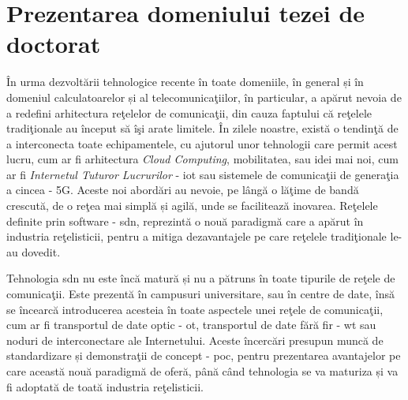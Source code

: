 \section{Prezentarea domeniului tezei de doctorat}

În urma dezvoltării tehnologice recente în toate domeniile, în general și în domeniul calculatoarelor și al telecomunicaţiilor, în particular, a apărut nevoia de a redefini arhitectura reţelelor de comunicaţii, din cauza faptului că reţelele tradiţionale au început să îşi arate limitele. În zilele noastre, există o tendinţă de a interconecta toate echipamentele, cu ajutorul unor tehnologii care permit acest lucru, cum ar fi arhitectura \textit{Cloud Computing}, mobilitatea, sau idei mai noi, cum ar fi \textit{Internetul Tuturor Lucrurilor} - \gls{iot} sau sistemele de comunicaţii de generaţia a cincea - 5G. Aceste noi abordări au nevoie, pe lângă o lăţime de bandă crescută, de o reţea mai simplă și agilă, unde se facilitează inovarea. Reţelele definite prin software - \gls{sdn}, reprezintă o nouă paradigmă care a apărut în industria reţelisticii, pentru a mitiga dezavantajele pe care reţelele tradiţionale le-au dovedit.

Tehnologia \gls{sdn} nu este încă matură și nu a pătruns în toate tipurile de reţele de comunicaţii. Este prezentă în campusuri universitare, sau în centre de date, însă se încearcă introducerea acesteia în toate aspectele unei reţele de comunicaţii, cum ar fi transportul de date optic - \gls{ot}, transportul de date fără fir - \gls{wt} sau noduri de interconectare ale Internetului. Aceste încercări presupun muncă de standardizare și demonstraţii de concept - \gls{poc}, pentru prezentarea avantajelor pe care această nouă paradigmă de oferă, până când tehnologia se va maturiza și va fi adoptată de toată industria reţelisticii.